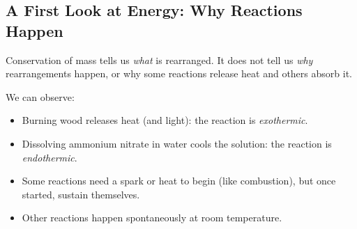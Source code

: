 \documentclass[12pt, a4paper]{book}
\theoremstyle{definition}
\newcommand{\newterm}[1]{\textit{\textcolor{DiscoveryColor}{#1}}}
\begin{document}
\subsection{A First Look at Energy: Why Reactions Happen}

Conservation of mass tells us \emph{what} is rearranged.
It does not tell us \emph{why} rearrangements happen,
or why some reactions release heat and others absorb it.

We can observe:

\begin{itemize}[leftmargin=2em]
  \item Burning wood releases heat (and light):
        the reaction is \newterm{exothermic}.
  \item Dissolving ammonium nitrate in water cools the solution:
        the reaction is \newterm{endothermic}.
  \item Some reactions need a spark or heat to begin
        (like combustion), but once started, sustain themselves.
  \item Other reactions happen spontaneously at room temperature.
\end{itemize}
\end{document}
